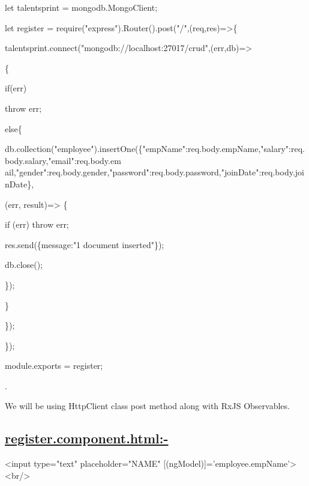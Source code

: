 \documentclass[11pt,twoside]{article}
\begin{document}
let talentsprint = mongodb.MongoClient;

\vspace{1\baselineskip}
let register = require("express").Router().post("/",(req,res)=>\{

   \hspace*{15}talentsprint.connect("mongodb://localhost:27017/crud",(err,db)=> 
   
   \hspace*{15}\{

    \hspace*{25}if(err)

    \hspace*{35}throw err;

    \hspace*{25}else\{

\vspace{1\baselineskip}
db.collection("employee").insertOne(\{"empName":req.body.empName,"salary":req.body.salary,"email":req.body.em ail,"gender":req.body.gender,"password":req.body.password,"joinDate":req.body.joinDate\},
      
\hspace*{35}(err, result)=> \{
            
  \hspace*{45}if (err) throw err;

  \hspace*{45}res.send(\{message:"1 document inserted"\});

  \hspace*{45}db.close();

  \hspace*{40}\});
          
  \hspace*{35}\}

  \hspace*{30}\});

  \hspace*{25}\});

module.exports = register;

\vspace{21\baselineskip}
.

We will be using HttpClient class post method along with RxJS Observables.

\subsection*{\uline{register.component.html:-}}

\vspace{1\baselineskip}
<input type="text" placeholder="NAME" [(ngModel)]='employee.empName'><br/>
\end{document}

